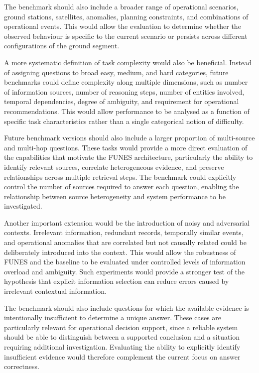 The benchmark should also include a broader range of operational scenarios, ground stations, satellites, anomalies, planning constraints, and combinations of operational events. This would allow the evaluation to determine whether the observed behaviour is specific to the current scenario or persists across different configurations of the ground segment.

A more systematic definition of task complexity would also be beneficial. Instead of assigning questions to broad easy, medium, and hard categories, future benchmarks could define complexity along multiple dimensions, such as number of information sources, number of reasoning steps, number of entities involved, temporal dependencies, degree of ambiguity, and requirement for operational recommendations. This would allow performance to be analysed as a function of specific task characteristics rather than a single categorical notion of difficulty.

Future benchmark versions should also include a larger proportion of multi-source and multi-hop questions. These tasks would provide a more direct evaluation of the capabilities that motivate the FUNES architecture, particularly the ability to identify relevant sources, correlate heterogeneous evidence, and preserve relationships across multiple retrieval steps. The benchmark could explicitly control the number of sources required to answer each question, enabling the relationship between source heterogeneity and system performance to be investigated.

Another important extension would be the introduction of noisy and adversarial contexts. Irrelevant information, redundant records, temporally similar events, and operational anomalies that are correlated but not causally related could be deliberately introduced into the context. This would allow the robustness of FUNES and the baseline to be evaluated under controlled levels of information overload and ambiguity. Such experiments would provide a stronger test of the hypothesis that explicit information selection can reduce errors caused by irrelevant contextual information.

The benchmark should also include questions for which the available evidence is intentionally insufficient to determine a unique answer. These cases are particularly relevant for operational decision support, since a reliable system should be able to distinguish between a supported conclusion and a situation requiring additional investigation. Evaluating the ability to explicitly identify insufficient evidence would therefore complement the current focus on answer correctness.

